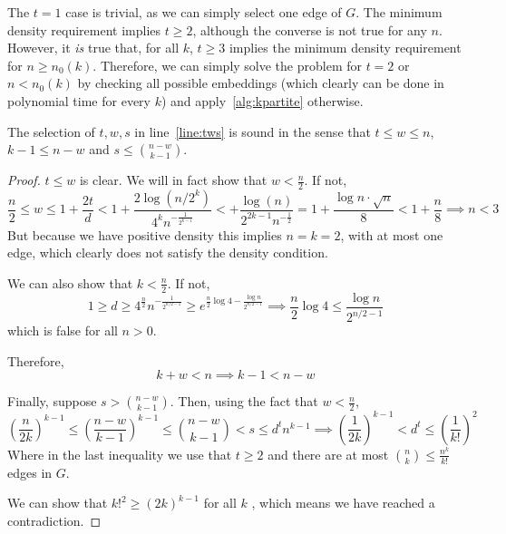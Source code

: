 \begin{remark} %
    The $t=1$ case is trivial, as we can simply select one edge of $G$.
    The minimum density requirement implies $t \geq 2$, although the converse is not true for any $n$.
    However, it \emph{is} true that, for all $k$, $t \geq 3$ implies the minimum density requirement
    for $n \geq n_0(k)$.
    Therefore, we can simply solve the problem for $t = 2$ or $n < n_0(k)$
    by checking all possible embeddings (which clearly can be done in polynomial time for every $k$) and apply~\ref{alg:kpartite} otherwise.
\end{remark}

\begin{lemma}
    The selection of $t, w, s$ in line~\ref{line:tws} is sound in the sense that
    $t  \leq w \leq n$, $k - 1 \leq n - w$ and $s \leq \binom{n - w}{k - 1}$.
    \begin{proof}
        $t \leq w$ is clear.
        We will in fact show that $w < \frac{n}{2}$.
        If not,
        \[
            \frac{n}{2} \leq
            w \leq 1 + \frac{2t}{d} <
            1 + \frac{2 \log (n/2^k)}{4^k n^{-\frac{1}{2^{k-1}}}} <
            + \frac{\log(n)}{2^{2k-1} n^{-\frac{1}{2}}} =
            1 + \frac{\log n \cdot \sqrt {n}}{8} <
            1 + \frac{n}{8} \implies n < 3
        \]
        But because we have positive density this implies $n = k = 2$, with at most one edge, which clearly
        does not satisfy the density condition.

        We can also show that $k < \frac{n}{2}$.
        If not,
        \[
            1 \geq
            d \geq
            4^{\frac{n}{2}} n^{-\frac{1}{2^{n/2-1}}} \geq
            e^{\frac{n}{2} \log 4 - \frac{\log n}{2^{n/2-1}}} \implies
            \frac{n}{2} \log 4 \leq \frac{\log n}{2^{n/2-1}}
        \]
        which is false for all $n > 0$. %

        Therefore,
        \[
            k + w < n \implies k - 1 < n - w
        \]

        Finally, suppose $s > \binom{n - w}{k - 1}$.
        Then, using the fact that $w < \frac{n}{2}$,
        \[
            \left( \frac{n}{2k} \right)^{k-1} \leq \left( \frac{n-w}{k-1} \right)^{k-1} \leq \binom{n - w}{k - 1} < s \leq d^t n^{k-1}
            \implies  \left( \frac{1}{2k} \right)^{k-1} < d^t \leq \left( \frac{1}{k!} \right)^2
        \]
        Where in the last inequality we use that $t \geq 2$ and there are at most
        $\binom{n}{k} \leq \frac{n^k}{k!}$ edges in $G$.

        We can show that $k!^2 \geq (2k)^{k-1}$ for all $k$ %
        , which means we have reached a contradiction. \qedhere

    \end{proof}
\end{lemma}


